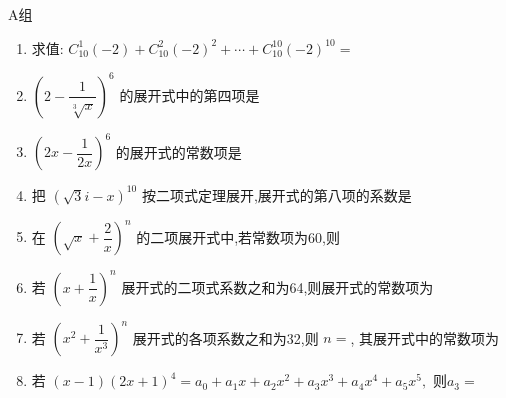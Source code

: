 A组
\begin{enumerate}
\item 求值: $C_{10}^{1}(-2)+C_{10}^{2}(-2)^{2}+\cdots+C_{10}^{10}(-2)^{10}=$

\item $(2-\dfrac{1}{\sqrt[3]{x}})^{6}$ 的展开式中的第四项是

\item $(2x-\dfrac{1}{2x})^{6}$ 的展开式的常数项是

\item 把 $(\sqrt{3}i-x)^{10}$ 按二项式定理展开,展开式的第八项的系数是

\item 在 $(\sqrt{x}+\dfrac{2}{x})^{n}$ 的二项展开式中,若常数项为60,则

\item 若 $(x+\dfrac{1}{x})^{n}$ 展开式的二项式系数之和为64,则展开式的常数项为

\item 若 $(x^{2}+\dfrac{1}{x^{3}})^{n}$ 展开式的各项系数之和为32,则 $n=$, 其展开式中的常数项为

\item 若 $(x-1)(2x+1)^{4}=a_{0}+a_{1}x+a_{2}x^{2}+a_{3}x^{3}+a_{4}x^{4}+a_{5}x^{5},$ 则$a_3=$
\end{enumerate}

\vspace{1em}


